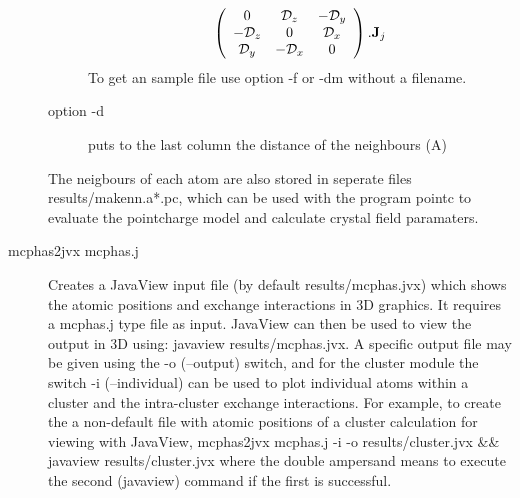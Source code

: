 \begin{description}
\begin{description}
\begin{eqnarray}
\left( \begin{array}{ccc}
 0 &  \mathcal D_z & -\mathcal D_y\\
-\mathcal D_z &   0 &\mathcal D_x \\
\mathcal D_y &  -\mathcal D_x &  0 \\
\end{array}
\right) .\mathbf J_j
\end{eqnarray}
              To get an sample file use option -f or -dm without a filename.      
\item[option {\prg -d}] puts to the last column the distance of the neighbours (A)
\end{description}

The neigbours of each atom are also stored in seperate files
{\prg results\//makenn.a*.pc}, which can be used with the program {\prg pointc} to evaluate
the pointcharge model and calculate crystal field paramaters.
\item [\prg mcphas2jvx mcphas.j] 
Creates a JavaView input file (by default {\prg results/mcphas.jvx}) which shows the atomic positions 
and exchange interactions in 3D graphics. It requires a {\prg mcphas.j} type file as input. JavaView can
then be used to view the output in 3D using: {\prg javaview results/mcphas.jvx}. A specific output file 
may be given using the {\prg -o} ({\prg --output}) switch, and for the cluster module the switch {\prg -i} 
({\prg --individual}) can be used to plot individual atoms within a cluster and the intra-cluster exchange 
interactions. For example, to create the a non-default file with atomic positions of a cluster calculation 
for viewing with JavaView, {\prg mcphas2jvx mcphas.j -i -o results/cluster.jvx \&\& javaview results/cluster.jvx} 
where the double ampersand means to execute the second ({\prg javaview}) command if the first is successful.


\end{description}
